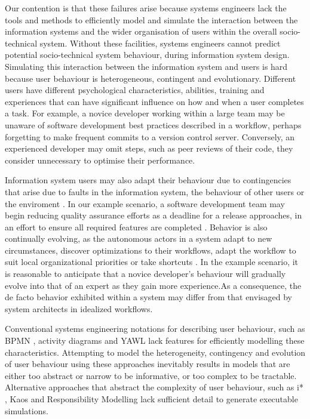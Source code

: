 \documentclass{llncs}
\begin{document}
Our contention is that these failures arise because systems engineers lack the tools and methods to efficiently model
and simulate the interaction between the information systems and the wider organisation of users within the overall
socio-technical system.  Without these facilities, systems engineers cannot predict potential socio-technical system
behaviour, during information system design. Simulating this interaction between the information system and users is
hard because user behaviour is heterogeneous, contingent and evolutionary.  Different users have different psychological
characteristics, abilities, training and experiences that can have significant influence on how and when a user
completes a task.  For example, a novice developer working within a large team may be unaware of software development
best practices described in a workflow, perhaps forgetting to make frequent commits to a version control server.
Conversely, an experienced developer may omit steps, such as peer reviews of their code, they consider unnecessary to
optimise their performance.

Information system users may also adapt their behaviour due to contingencies that arise due to faults in the information
system, the behaviour of other users or the enviroment \citep{sommerville09deriving}.  In our example scenario, a
software development team may begin reducing quality assurance efforts as a deadline for a release approaches, in an
effort to ensure all required features are completed \citep{beck02test}. Behavior is also continually evolving, as the
autonomous actors in a system adapt to new circumstances, discover optimizations to their workflows, adapt the workflow
to suit local organizational priorities or take shortcuts
\citep{anderson04heterogeneous,bonen79evolutionary,lyytinen2008explaining}.  In the example scenario, it is reasonable
to anticipate that a novice developer's behaviour will gradually evolve into that of an expert as they gain more
experience.As a consequence, the de facto behavior exhibited within a system may differ from that envisaged by system
architects in idealized workflows.

Conventional systems engineering notations for describing user behaviour, such as BPMN \citep{omg2011omgbpmn}, activity
diagrams \citep{omg07omguml} and YAWL \citep{hofstede2010yawl} lack features for efficiently modelling these
characteristics.  Attempting to model the heterogeneity, contingency and evolution of user behaviour using these
approaches inevitably results in models that are either too abstract or narrow to be informative, or too complex to be
tractable.  Alternative approaches that abstract the complexity of user behaviour, such as i* \citep{yu1995social},
Kaos \citep{werneck2009goreistarkaos} and Responsibility Modelling \citep{sommerville09deriving} lack sufficient detail to
generate executable simulations.
\end{document}
